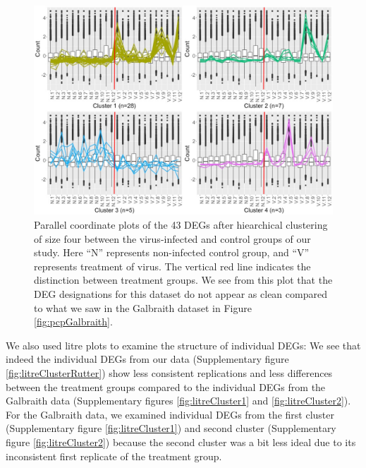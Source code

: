 \documentclass[11pt,a4paper,oldfontcommands,openany]{memoir}
\numberwithin{equation}{section} %
\begin{document}
\begin{figure}[H]
\centering
\begin{framed}
  \includegraphics[width=\textwidth]{Images/N_V_4.png}
  \end{framed}
  \caption{Parallel coordinate plots of the 43 DEGs after hiearchical clustering of size four between the virus-infected and control groups of our study. Here ``N'' represents non-infected control group, and ``V'' represents treatment of virus. The vertical red line indicates the distinction between treatment groups. We see from this plot that the DEG designations for this dataset do not appear as clean compared to what we saw in the Galbraith dataset in Figure \ref{fig:pcpGalbraith}.}
  \label{fig:pcpRutterVirus}
\end{figure}

We also used litre plots to examine the structure of individual DEGs: We see that indeed the individual DEGs from our data (Supplementary figure \ref{fig:litreClusterRutter}) show less consistent replications and less differences between the treatment groups compared to the individual DEGs from the Galbraith data (Supplementary figures \ref{fig:litreCluster1} and \ref{fig:litreCluster2}). For the Galbraith data, we examined individual DEGs from the first cluster (Supplementary figure \ref{fig:litreCluster1}) and second cluster (Supplementary figure \ref{fig:litreCluster2}) because the second cluster was a bit less ideal due to its inconsistent first replicate of the treatment group.
\end{document}
